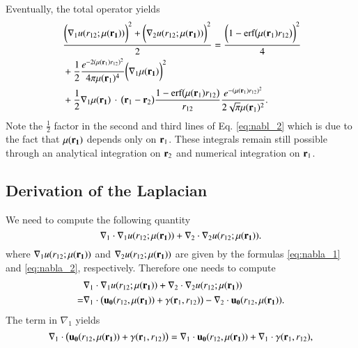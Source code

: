 \documentclass[aip,jcp,reprint,noshowkeys,superscriptaddress]{revtex4-1}
\newcommand{\bd}[1]{{\bf {#1}}}
\newcommand{\br}[0]{{\bf {r}}}
\newcommand{\bri}[1]{{\bf r}_{#1}}
\newcommand{\mur}[1]{\mu({\bf r_{#1}})}
\begin{document}
Eventually, the total operator yields
\begin{equation}
 \label{eq:nabl_2}
 \begin{aligned}
 & \frac{\bigg( \nabla_1  u(r_{12};\mur{1})\bigg)^2 + \bigg( \nabla_2  u(r_{12};\mur{1})\bigg)^2}{2} =  \frac{\bigg(1 - \text{erf}\big(\mu(\bri{1}) r_{12} \big)\bigg)^2}{4} \\
 &  +  \frac{1}{2}\frac{e^{-2(\mu(\bri{1}) r_{12})^2}}{4 \pi \mu(\bri{1})^4} \bigg( \nabla_1  \mur{1}\bigg)^2 \\ 
 &  +  \frac{1}{2} \nabla_1  \mur{1} \, \cdot \, \big( \br{}_1 - \br{}_2\big) \frac{1 - \text{erf}\big(\mu(\bri{1}) r_{12} \big)}{r_{12}} \frac{e^{-(\mu(\bri{1}) r_{12})^2}}{2 \sqrt{\pi}\mu(\bri{1})^2} .
 \end{aligned}
\end{equation}
Note the $\frac{1}{2}$ factor in the second and third lines of Eq. \eqref{eq:nabl_2} which is due to the fact that $\mur{1}$ depends only on $\bd{r}_1$. 
These integrals remain still possible through an analytical integration on $\bd{r}_2$ and numerical integration on $\bd{r}_1$. 

\subsection{Derivation of the Laplacian}
We need to compute the following quantity 
\begin{equation}
 \nabla_1 \cdot \nabla_1 u(r_{12};\mur{1}) + \nabla_2 \cdot \nabla_2 u(r_{12};\mur{1}).
\end{equation}
where $\nabla_1 u(r_{12};\mur{1}) $ and $\nabla_2 u(r_{12};\mur{1})$ are given by the formulas \eqref{eq:nabla_1} and \eqref{eq:nabla_2}, respectively. 
Therefore one needs to compute 
\begin{equation}
 \begin{aligned}
& \nabla_1 \cdot \nabla_1 u(r_{12};\mur{1}) + \nabla_2 \cdot \nabla_2 u(r_{12};\mur{1}) \\
=& \nabla_1 \cdot \big( {\bf u_0}(r_{12},\mur{1}) + {\bf \gamma}(\br_1, r_{12}) \big) - \nabla_2 \cdot  {\bf u_0}(r_{12},\mur{1}). 
 \end{aligned}
\end{equation}
The term in $\nabla_1 $ yields 
\begin{equation}
 \nabla_1 \cdot \big( {\bf u_0}(r_{12},\mur{1}) + {\bf \gamma}(\br_1, r_{12}) \big) = \nabla_1 \cdot  {\bf u_0}(r_{12},\mur{1}) + \nabla_1 \cdot {\bf \gamma}(\br_1, r_{12}),  
\end{equation}
\end{document}
